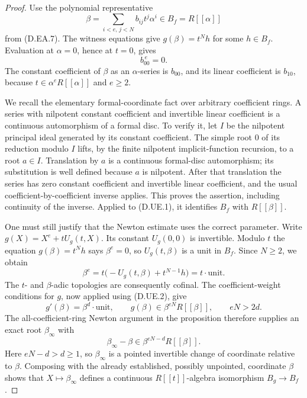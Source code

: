 \begin{proof}
Use the polynomial representative
\[
       \beta=\sum_{i<e,\,j<N}b_{ij}t^j\alpha^i\in B_f=R[[\alpha]]
\]
from (D.EA.7). The witness equations give $g(\beta)=t^N h$ for
some $h\in B_f$. Evaluation at $\alpha=0$, hence at $t=0$, gives
\[
                              b_{00}^{\,e}=0.           \tag{D.UE.1}
\]
The constant coefficient of $\beta$ as an $\alpha$-series is
$b_{00}$, and its linear coefficient is $b_{10}$, because
$t\in\alpha^eR[[\alpha]]$ and $e\ge2$.

We recall the elementary formal-coordinate fact over arbitrary
coefficient rings. A series with nilpotent constant coefficient
and invertible linear coefficient is a continuous automorphism
of a formal disc. To verify it, let $I$ be the nilpotent principal
ideal generated by its constant coefficient. The simple root
$0$ of its reduction modulo $I$ lifts, by the finite nilpotent
implicit-function recursion, to a root $a\in I$. Translation by
$a$ is a continuous formal-disc automorphism; its substitution
is well defined because $a$ is nilpotent. After that translation
the series has zero constant coefficient and invertible linear
coefficient, and the usual coefficient-by-coefficient inverse
applies. This proves the assertion, including continuity of the
inverse. Applied to (D.UE.1), it identifies $B_f$ with $R[[\beta]]$.

One must still justify that the Newton estimate uses the correct
parameter. Write $g(X)=X^e+tU_g(t,X)$. Its constant
$U_g(0,0)$ is invertible. Modulo $t$ the equation $g(\beta)=t^Nh$
says $\beta^e=0$, so $U_g(t,\beta)$ is a unit in $B_f$.
Since $N\ge2$, we obtain
\[
       \beta^e=t\bigl(-U_g(t,\beta)+t^{N-1}h\bigr)
                    =t\cdot\text{unit}.               \tag{D.UE.2}
\]
The $t$- and $\beta$-adic topologies are consequently cofinal.
The coefficient-weight conditions for $g$, now applied using
(D.UE.2), give
\[
                 g'(\beta)=\beta^d\cdot\text{unit},
       \qquad g(\beta)\in\beta^{eN}R[[\beta]],
       \qquad eN>2d.                                  \tag{D.UE.3}
\]
The all-coefficient-ring Newton argument in the proposition
therefore supplies an exact root $\beta_\infty$ with
\[
           \beta_\infty-\beta\in
                    \beta^{eN-d}R[[\beta]].            \tag{D.UE.4}
\]
Here $eN-d>d\ge1$, so $\beta_\infty$ is a pointed invertible
change of coordinate relative to $\beta$. Composing with the
already established, possibly unpointed, coordinate $\beta$
shows that $X\mapsto\beta_\infty$ defines a continuous
$R[[t]]$-algebra isomorphism $B_g\to B_f$.


\end{proof}
